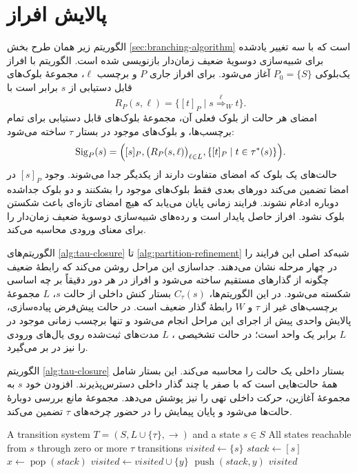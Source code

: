 \section{پالایش افراز}

الگوریتم زیر همان طرح بخش \ref{sec:branching-algorithm} است که با سه تغییر یادشده برای شبیه‌سازی دوسویهٔ ضعیف زمان‌دار بازنویسی شده است. الگوریتم با افراز یک‌بلوکی $P_0=\{S\}$ آغاز می‌شود. برای افراز جاری $P$ و برچسب $\ell$، مجموعهٔ بلوک‌های قابل دستیابی از $s$ برابر است با
\[
R_P(s,\ell)=\{[t]_P\mid s\overset{\ell}{\Rightarrow}_W t\}.
\]
امضای هر حالت از بلوک فعلی آن، مجموعهٔ بلوک‌های قابل دستیابی برای تمام برچسب‌ها، و بلوک‌های موجود در بستار $\tau$ ساخته می‌شود:
\[
\operatorname{Sig}_P(s)=
\Bigl([s]_P,\bigl(R_P(s,\ell)\bigr)_{\ell\in L},
\{[t]_P\mid t\in\tau^*(s)\}\Bigr).
\]
حالت‌های یک بلوک که امضای متفاوت دارند از یکدیگر جدا می‌شوند. وجود $[s]_P$ در امضا تضمین می‌کند دورهای بعدی فقط بلوک‌های موجود را بشکنند و دو بلوک جداشده دوباره ادغام نشوند. فرایند زمانی پایان می‌یابد که هیچ امضای تازه‌ای باعث شکستن بلوک نشود. افراز حاصل پایدار است و رده‌های شبیه‌سازی دوسویهٔ ضعیف زمان‌دار را برای معنای ورودی محاسبه می‌کند.

الگوریتم‌های \ref{alg:tau-closure} تا \ref{alg:partition-refinement} شبه‌کد اصلی این فرایند را در چهار مرحله نشان می‌دهند. جداسازی این مراحل روشن می‌کند که رابطهٔ ضعیف چگونه از گذارهای مستقیم ساخته می‌شود و افراز در هر دور دقیقاً بر چه اساسی شکسته می‌شود. در این الگوریتم‌ها، $C_\tau(s)$ بستار کنش داخلی از حالت $s$، $L$ مجموعهٔ برچسب‌های غیر از $\tau$ و $W$ رابطهٔ گذار ضعیف است. در حالت پیش‌فرض پیاده‌سازی، پالایش واحدی پیش از اجرای این مراحل انجام می‌شود و تنها برچسب زمانی موجود در $L$ برابر یک واحد است؛ در حالت تشخیصی ، $L$ مدت‌های ثبت‌شده روی یال‌های ورودی را نیز در بر می‌گیرد.

الگوریتم \ref{alg:tau-closure} بستار داخلی یک حالت را محاسبه می‌کند. این بستار شامل همهٔ حالت‌هایی است که با صفر یا چند گذار داخلی دسترس‌پذیرند. افزودن خود $s$ به مجموعهٔ آغازین، حرکت داخلی تهی را نیز پوشش می‌دهد. مجموعهٔ  مانع بررسی دوبارهٔ حالت‌ها می‌شود و پایان پیمایش را در حضور چرخه‌های $\tau$ تضمین می‌کند.

\begin{algorithm}[htbp]
\onehalfspacing
\caption{}
\label{alg:tau-closure}
\begin{latin}
\begin{algorithmic}[1]
\REQUIRE A transition system $T=(S,L\cup\{\tau\},\rightarrow)$ and a state $s\in S$
\ENSURE All states reachable from $s$ through zero or more $\tau$ transitions
\STATE $\mathit{visited}\gets\{s\}$
\STATE $\mathit{stack}\gets[s]$
    \STATE $x\gets\operatorname{pop}(\mathit{stack})$
            \STATE $\mathit{visited}\gets\mathit{visited}\cup\{y\}$
            \STATE $\operatorname{push}(\mathit{stack},y)$
        \ENDIF
    \ENDFOR
\ENDWHILE
\RETURN $\mathit{visited}$
\end{algorithmic}
\end{latin}
\end{algorithm}

